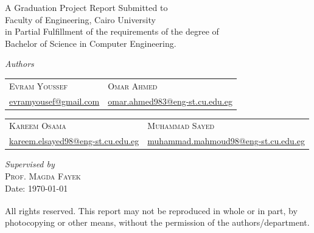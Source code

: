 \documentclass[a4paper,12pt]{report}
\begin{document}
\begin{titlepage}
\begin{center}
  {\LARGE{A Graduation Project Report Submitted to} \\[0.1cm] }
  {\LARGE {Faculty of Engineering, Cairo University} \\[0.1cm] }
  {\LARGE {in Partial Fulfillment of the requirements of the degree of} \\[0.1cm] }
  {\LARGE {Bachelor of Science in Computer Engineering.} \\[0.1cm] }
  \vspace{1cm}


\begin{center}
  {\LARGE \textit{Authors}}\\[0.5cm]

  \setlength{\tabcolsep}{1.5cm}
  \begin{tabular}{M{5cm}M{5cm}}
  \large \textsc{Evram Youssef} & \large \textsc{Omar Ahmed}\\[0.1cm]
  \large \href{evramyousef@gmail.com}{evramyousef@gmail.com} & \large \href{omar.ahmed983@eng-st.cu.edu.eg}{omar.ahmed983@eng-st.cu.edu.eg}\\[0.1cm]
  \end{tabular}

  \vspace{0.9cm}

  \setlength{\tabcolsep}{1.5cm}
  \begin{tabular}{M{5cm}M{5cm}}
  \large \textsc{Kareem Osama} & \large \textsc{Muhammad Sayed}\\[0.1cm]
  \large \href{kareem.elsayed98@eng-st.cu.edu.eg}{kareem.elsayed98@eng-st.cu.edu.eg} & \large \href{muhammad.mahmoud98@eng-st.cu.edu.eg}{muhammad.mahmoud98@eng-st.cu.edu.eg}\\[0.1cm]
    
  \end{tabular}
  \vspace{1cm}

  {\LARGE \textit{Supervised by}}\\
  \LARGE \textsc{Prof. Magda Fayek}\\[0.5cm]

  {\large {Date: \today}}
  \vspace{0.5cm}

  \small {\textsuperscript{\textcopyright} All rights reserved. This report may not be reproduced in whole or in part, by photocopying or other means, without the permission of the authors/department.}

\end{center}


\end{center}
\end{titlepage}
\end{document}
